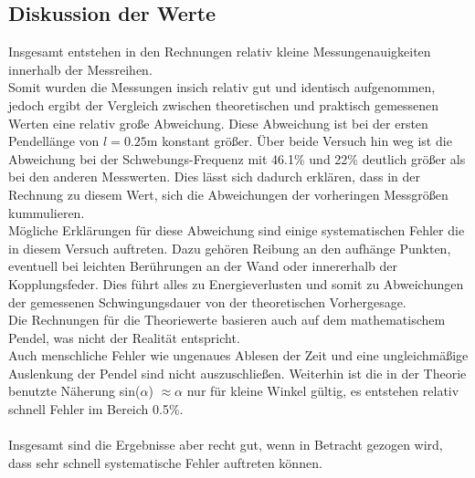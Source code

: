     \subsection{Diskussion der Werte}

        \noindent Insgesamt entstehen in den Rechnungen relativ kleine Messungenauigkeiten innerhalb der Messreihen.\\ Somit wurden die 
        Messungen insich relativ gut und identisch aufgenommen, jedoch ergibt der Vergleich zwischen theoretischen und praktisch 
        gemessenen Werten eine relativ große Abweichung. Diese Abweichung ist bei der ersten Pendellänge von $l = 0.25 \si{\meter}$ 
        konstant größer. Über beide Versuch hin weg ist die Abweichung bei der Schwebungs-Frequenz mit 46.1\% und 22\% deutlich größer als bei 
        den anderen Messwerten. Dies lässt sich dadurch erklären, dass in der Rechnung zu diesem Wert, sich die Abweichungen der vorheringen 
        Messgrößen kummulieren.\\

        \noindent Mögliche Erklärungen für diese Abweichung sind einige systematischen Fehler die in diesem Versuch auftreten. Dazu gehören 
        Reibung an den aufhänge Punkten, eventuell bei leichten Berührungen an der Wand oder innererhalb der Kopplungsfeder. Dies führt 
        alles zu Energieverlusten und somit zu Abweichungen der gemessenen Schwingungsdauer von der theoretischen Vorhergesage.\\
        Die Rechnungen für die Theoriewerte basieren auch auf dem mathematischem Pendel, was nicht der Realität entspricht.\\
        Auch menschliche Fehler wie ungenaues Ablesen der Zeit und eine ungleichmäßige Auslenkung der Pendel sind nicht auszuschließen.
        Weiterhin ist die in der Theorie benutzte Näherung sin($\alpha$) $\approx \alpha$ nur für kleine Winkel gültig, es entstehen 
        relativ schnell Fehler im Bereich 0.5\%.\\\\

        \noindent Insgesamt sind die Ergebnisse aber recht gut, wenn in Betracht gezogen wird, dass sehr schnell systematische Fehler auftreten können.
\newpage
